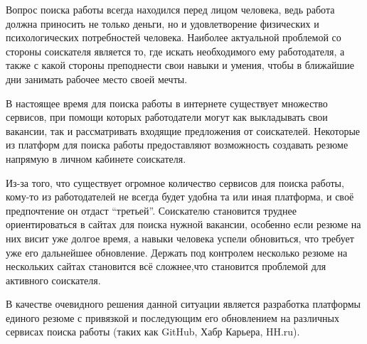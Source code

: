 \documentclass[master, och, pract]{SCWorks}
\begin{document}
\secNumbering

\tableofcontents





\intro
Вопрос поиска работы всегда находился перед лицом человека, ведь работа должна приносить 
не только деньги, но и удовлетворение физических и психологических потребностей человека.
Наиболее актуальной проблемой со стороны соискателя является то, где искать необходимого 
ему работодателя, а также с какой стороны преподнести свои навыки и умения, чтобы в 
ближайшие дни занимать рабочее место своей мечты. 

В настоящее время для поиска работы в интернете существует множество сервисов, 
при помощи которых работодатели могут как выкладывать свои вакансии, так и рассматривать 
входящие предложения от соискателей. Некоторые из платформ для поиска работы 
предоставляют возможность создавать резюме напрямую в личном кабинете соискателя.

Из-за того, что существует огромное количество сервисов для поиска работы, кому-то 
из работодателей не всегда будет удобна та или иная платформа, и своё предпочтение 
он отдаст “третьей”. Соискателю становится труднее ориентироваться в сайтах для поиска 
нужной вакансии, особенно если резюме на них висит уже долгое время, а навыки человека 
успели обновиться, что требует уже его дальнейшее обновление. Держать под контролем 
несколько резюме на нескольких сайтах становится всё сложнее,что становится проблемой 
для активного соискателя.

В качестве очевидного решения данной ситуации является разработка платформы единого резюме 
с привязкой и последующим его обновлением на различных сервисах поиска работы (таких 
как GitHub, Хабр Карьера, HH.ru).
\end{document}
